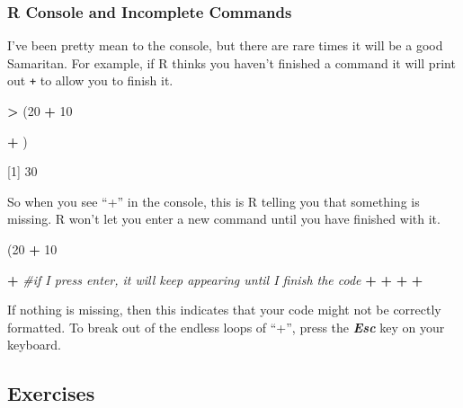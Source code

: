 \documentclass[
]{book}
\newenvironment{Shaded}{\begin{snugshade}}{\end{snugshade}}
\newcommand{\CommentTok}[1]{\textcolor[rgb]{0.56,0.35,0.01}{\textit{#1}}}
\newcommand{\DecValTok}[1]{\textcolor[rgb]{0.00,0.00,0.81}{#1}}
\newcommand{\NormalTok}[1]{#1}
\newcommand{\SpecialCharTok}[1]{\textcolor[rgb]{0.81,0.36,0.00}{\textbf{#1}}}
\begin{document}
\hypertarget{r-console-and-incomplete-commands}{%
\subsubsection{R Console and Incomplete Commands}\label{r-console-and-incomplete-commands}}

I've been pretty mean to the console, but there are rare times it will be a good Samaritan. For example, if R thinks you haven't finished a command it will print out \texttt{+} to allow you to finish it.

\begin{Shaded}
\begin{Highlighting}[]
\SpecialCharTok{\textgreater{}}\NormalTok{ (}\DecValTok{20} \SpecialCharTok{+} \DecValTok{10}
 
\SpecialCharTok{+}\NormalTok{ )}

\NormalTok{[}\DecValTok{1}\NormalTok{] }\DecValTok{30}
\end{Highlighting}
\end{Shaded}

So when you see ``+'' in the console, this is R telling you that something is missing. R won't let you enter a new command until you have finished with it.

\begin{Shaded}
\begin{Highlighting}[]
\NormalTok{(}\DecValTok{20} \SpecialCharTok{+} \DecValTok{10}

\SpecialCharTok{+} \CommentTok{\#if I press enter, it will keep appearing until I finish the code}
\SpecialCharTok{+}
\SpecialCharTok{+}
\SpecialCharTok{+}
\SpecialCharTok{+}
\end{Highlighting}
\end{Shaded}

If nothing is missing, then this indicates that your code might not be correctly formatted. To break out of the endless loops of ``+'', press the \textbf{\emph{Esc}} key on your keyboard.

\hypertarget{exercises}{%
\subsection{Exercises}\label{exercises}}
\end{document}
